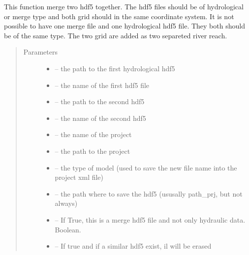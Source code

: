 \documentclass[letterpaper,10pt,english]{sphinxmanual}
\begin{document}

\begin{fulllineitems}
\label{\detokenize{index:src.load_hdf5.addition_hdf5}}
This function merge two hdf5 together. The hdf5 files should be of hydrological or merge type and both grid should
in the same coordinate system. It is not possible to have one merge file and one hydrological hdf5 file. They both
should be of the same type. The two grid are added as two separeted river reach.
\begin{quote}\begin{description}
\item[{Parameters}] \leavevmode\begin{itemize}
\item {} 
 -- the path to the first hydrological hdf5

\item {} 
 -- the name of the first hdf5 file

\item {} 
 -- the path to the second hdf5

\item {} 
 -- the name of the second hdf5

\item {} 
 -- the name of the project

\item {} 
 -- the path to the project

\item {} 
 -- the type of model (used to save the new file name into the project xml file)

\item {} 
 -- the path where to save the hdf5 (ususally path\_prj, but not always)

\item {} 
 -- If True, this is a merge hdf5 file and not only hydraulic data. Boolean.

\item {} 
 -- If true and if a similar hdf5 exist, il will be erased

\end{itemize}

\end{description}\end{quote}

\end{fulllineitems}
\end{document}
